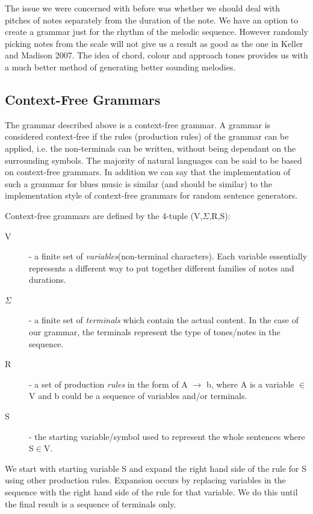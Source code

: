 \documentclass[pdftex,12pt,a4paper]{report}
\begin{document}
The issue we were concerned with before was whether we should deal with pitches of notes separately from the duration of the note. We have an option to create a grammar just for the rhythm of the melodic sequence. However randomly picking notes from the scale will not give us a result as good as the one in Keller and Madison 2007. The idea of chord, colour and approach tones provides us with a much better method of generating better sounding melodies.

\subsection{Context-Free Grammars}
The grammar described above is a context-free grammar. A grammar is considered context-free if the rules (production rules) of the grammar can be applied, i.e. the non-terminals can be written, without being dependant on the surrounding symbols. The majority of natural languages can be said to be based on context-free grammars. In addition we can say that the implementation of such a grammar for blues music is similar (and should be similar) to the implementation style of context-free grammars for random sentence generators. 

Context-free grammars are defined by the 4-tuple (V,$\Sigma$,R,S):

\begin{description}
  \item[V] - a finite set of \emph{variables}(non-terminal characters). Each variable essentially represents a different way to put together different families of notes and durations.
  \item[$\Sigma$]  - a finite set of \emph{terminals} which contain the actual content. In the case of our grammar, the terminals represent the type of tones/notes in the sequence.
  \item[R] - a set of production \emph{rules} in the form of A $\rightarrow$ b, where A is a variable $\in$V and b could be a sequence of variables and/or terminals.
  \item[S] - the starting variable/symbol used to represent the whole sentences where S$\in$V.
\end{description}


We start with starting variable S and expand the right hand side of the rule for S using other production rules. Expansion occurs by replacing variables in the sequence with the right hand side of the rule for that variable. We do this until the final result is a sequence of terminals only.
\end{document}
